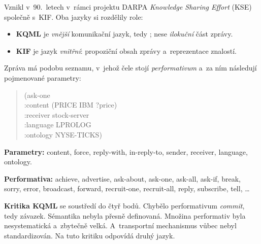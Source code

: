 \documentclass[11pt,a4paper]{article}
\theoremstyle{definition}
\begin{document}
\begin{defbox}
Vznikl v~90.~letech v~rámci projektu DARPA \emph{Knowledge Sharing Effort} (KSE) společně s~KIF.
Oba jazyky si rozdělily role:
\begin{itemize}
\item \textbf{KQML} je \emph{vnější} komunikační jazyk, tedy ; nese
  \emph{ilokuční} část zprávy.
\item \textbf{KIF} je jazyk \emph{vnitřní}: propoziční obsah zprávy a~reprezentace znalostí.
\end{itemize}
Zpráva má podobu seznamu, v~jehož čele stojí \emph{performativum} a~za ním následují pojmenované
parametry:
\begin{quote}\small\ttfamily
(ask-one\\
\hspace*{1em}:content (PRICE IBM ?price)\\
\hspace*{1em}:receiver stock-server\\
\hspace*{1em}:language LPROLOG\\
\hspace*{1em}:ontology NYSE-TICKS)
\end{quote}
\textbf{Parametry:} content, force, reply-with, in-reply-to, sender, receiver, language, ontology.

\textbf{Performativa:} achieve, advertise, ask-about, ask-one, ask-all, ask-if,
break, sorry, error, broadcast, forward, recruit-one, recruit-all, reply, subscribe, tell, \dots
\end{defbox}

\textbf{Kritika KQML} se soustředí do čtyř bodů. Chybělo performativum \emph{commit}, tedy závazek.
Sémantika nebyla přesně definovaná. Množina performativ byla nesystematická a~zbytečně velká.
A~transportní mechanismus vůbec nebyl standardizován. Na tuto kritiku odpovídá druhý jazyk.
\end{document}
